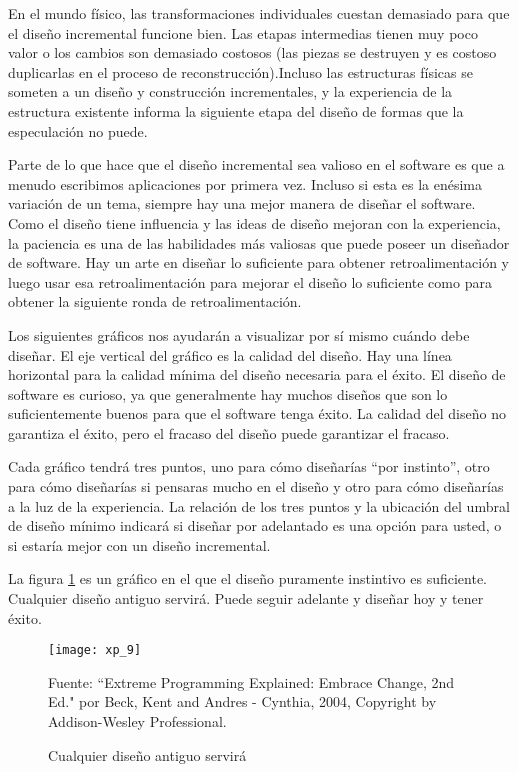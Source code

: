 \begin{spacing}{1.5}
				En el mundo físico, las transformaciones individuales cuestan demasiado para que el diseño incremental funcione bien. Las etapas intermedias tienen muy poco valor o los cambios son demasiado costosos (las piezas se destruyen y es costoso duplicarlas en el proceso de reconstrucción).Incluso las estructuras físicas se someten a un diseño y construcción incrementales, y la experiencia de la estructura existente informa la siguiente etapa del diseño de formas que la especulación no puede.
				
				Parte de lo que hace que el diseño incremental sea valioso en el software es que a menudo escribimos aplicaciones por primera vez. Incluso si esta es la enésima variación de un tema, siempre hay una mejor manera de diseñar el software. Como el diseño tiene influencia y las ideas de diseño mejoran con la experiencia, la paciencia es una de las habilidades más valiosas que puede poseer un diseñador de software. Hay un arte en diseñar lo suficiente para obtener retroalimentación y luego usar esa retroalimentación para mejorar el diseño lo suficiente como para obtener la siguiente ronda de retroalimentación.
				
				Los siguientes gráficos nos ayudarán a visualizar por sí mismo cuándo debe diseñar. El eje vertical del gráfico es la calidad del diseño. Hay una línea horizontal para la calidad mínima del diseño necesaria para el éxito. El diseño de software es curioso, ya que generalmente hay muchos diseños que son lo suficientemente buenos para que el software tenga éxito. La calidad del diseño no garantiza el éxito, pero el fracaso del diseño puede garantizar el fracaso.
				
				Cada gráfico tendrá tres puntos, uno para cómo diseñarías ``por instinto'', otro para cómo diseñarías si pensaras mucho en el diseño y otro para cómo diseñarías a la luz de la experiencia. La relación de los tres puntos y la ubicación del umbral de diseño mínimo indicará si diseñar por adelantado es una opción para usted, o si estaría mejor con un diseño incremental.
				
				La figura \ref{figure:chaperII_10} es un gráfico en el que el diseño puramente instintivo es suficiente. Cualquier diseño antiguo servirá. Puede seguir adelante y diseñar hoy y tener éxito.
				\begin{figure}[H]
					\centering
					\texttt{[image: xp\_9]}
					\caption {\centering \small{Cualquier diseño antiguo servirá}} \label{figure:chaperII_10}
					\small {Fuente: ``Extreme Programming Explained: Embrace Change, 2nd Ed." por Beck, Kent and Andres - Cynthia, 2004, Copyright by Addison-Wesley Professional.}
				\end{figure}
				

\end{spacing}
